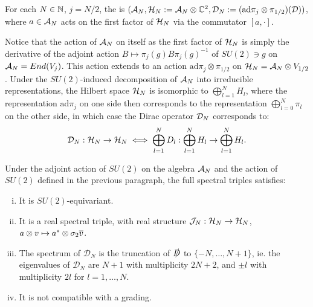 \begin{definition}
For each $N \in \mathbb{N}$, $j = N/2$, the  is $(\mathcal A_N, \textcolor{black}{\mathcal H_N} := \mathcal A_N \otimes \mathbb{C}^2, \textcolor{black}{\mathcal D_N} := (\text{ad}\pi_j \otimes \pi_{1/2})(\mathcal D) )$, where $a \in \mathcal A_N$ acts on the first factor of $\mathcal H_N$ via the commutator $[a, \cdot]$.
\end{definition}

Notice that the action of $\mathcal A_N$ on itself as the first factor of $\mathcal H_N$ is simply the derivative of the adjoint action $B \mapsto \pi_j(g) B \pi_j(g)^{-1}$ of $SU(2) \ni g$ on $\mathcal A_N = End(V_j)$. This action extends to an action $\text{ad}\pi_j \otimes \pi_{1/2}$ on $\mathcal H_N = \mathcal A_N \otimes V_{1/2}$. Under the $SU(2)$-induced decomposition of $\mathcal A_N$ into irreducible representations, the Hilbert space $\mathcal H_N$ is isomorphic to $\bigoplus_{l =1}^N H_l$, where the representation $\text{ad}\pi_j$ on one side then corresponds to the representation $\bigoplus_{l = 0}^N \pi_l$ on the other side, in which case the Dirac operator $\mathcal D_N$ corresponds to:
\begin{equation}\label{reducibleDiracDecomposition}
    \mathcal D_N : \mathcal H_N \to \mathcal H_N  \iff \bigoplus_{l =1}^N D_l: \bigoplus_{l =1}^N H_l \to \bigoplus_{l =1}^N H_l.
\end{equation}

\begin{theorem}\label{theoremReducibleSpectralTripleDiracApproximation}
Under the adjoint action of $SU(2)$ on the algebra $\mathcal A_N$ and the action of $SU(2)$ defined in the previous paragraph, the full spectral triples satisfies:
    \begin{enumerate}[(i)]
    
    \item It is $SU(2)$-equivariant.
    
    \item It is a real spectral triple, with real structure $\mathcal J_N: \mathcal H_N \to \mathcal H_N$, $a \otimes v \mapsto a^* \otimes \sigma_2 \overline{v}$.
    
    \item The spectrum of $\mathcal D_N$ is the truncation of $\slashed D$ to $\{-N, \dots, N+1\}$, ie. the eigenvalues of $\mathcal D_N$ are $N+1$ with multiplicity $2N+2$, and $\pm l$ with multiplicity $2l$ for $l = 1, \dots, N$.
    
    \item It is not compatible with a grading.
    
    \end{enumerate}
\end{theorem}

